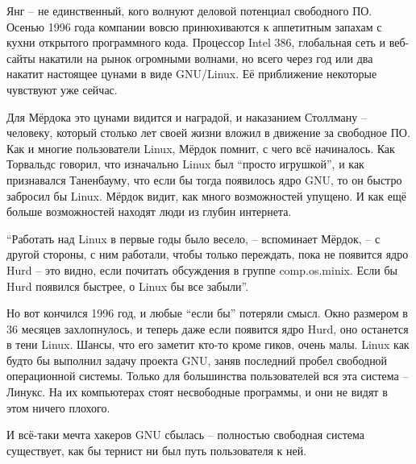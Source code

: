 Янг -- не единственный, кого волнуют деловой потенциал свободного ПО. Осенью 1996 года компании вовсю принюхиваются к аппетитным запахам с кухни открытого программного кода. Процессор Intel 386, глобальная сеть и веб-сайты накатили на рынок огромными волнами, но всего через год или два накатит настоящее цунами в виде GNU/Linux. Её приближение некоторые чувствуют уже сейчас.

Для Мёрдока это цунами видится и наградой, и наказанием Столлману -- человеку, который столько лет своей жизни вложил в движение за свободное ПО. Как и многие пользователи Linux, Мёрдок помнит, с чего всё начиналось. Как Торвальдс говорил, что изначально Linux был ``просто игрушкой'', и как признавался Таненбауму, что если бы тогда появилось ядро GNU, то он быстро забросил бы Linux.  Мёрдок видит, как много возможностей упущено. И как ещё больше возможностей находят люди из глубин интернета.

``Работать над Linux в первые годы было весело, -- вспоминает Мёрдок, -- с другой стороны, с ним работали, чтобы только переждать, пока не появится ядро Hurd -- это видно, если почитать обсуждения в группе comp.os.minix. Если бы Hurd появился быстрее, о Linux бы все забыли''.

Но вот кончился 1996 год, и любые ``если бы'' потеряли смысл. Окно размером в 36 месяцев захлопнулось, и теперь даже если появится ядро Hurd, оно останется в тени Linux. Шансы, что его заметит кто-то кроме гиков, очень малы. Linux как будто бы выполнил задачу проекта GNU, заняв последний пробел свободной операционной системы. Только для большинства пользователей вся эта система -- Линукс. На их компьютерах стоят несвободные программы, и они не видят в этом ничего плохого.

И всё-таки мечта хакеров GNU сбылась -- полностью свободная система существует, как бы тернист ни был путь пользователя к ней.

\theendnotes
\setcounter{endnote}{0}
